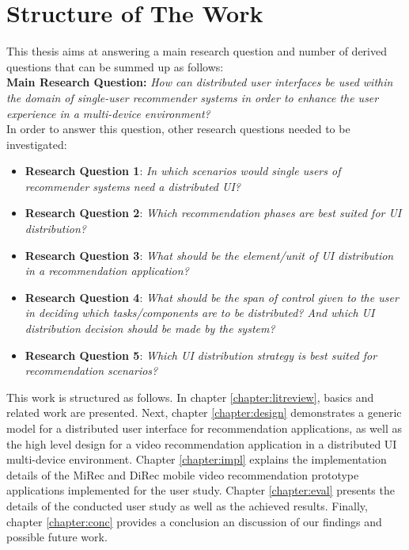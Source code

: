 \section{Structure of The Work}
This thesis aims at answering a main research question and number of derived
questions that can be summed up as follows:\\
\textbf{Main Research Question:} \textit{How can distributed user interfaces be
used within the domain of single-user recommender systems in order to enhance
the user experience in a multi-device environment? }\\
In order to answer this question, other research questions needed to be
investigated:
\begin{itemize}
\item \textbf{Research Question 1}: \textit{In which scenarios would single
users of recommender systems need a distributed UI?}
\item \textbf{Research Question 2}: \textit{Which recommendation phases are best
suited for UI distribution?}
\item \textbf{Research Question 3}: \textit{What should be the element/unit of
UI distribution in a recommendation application?}
\item \textbf{Research Question 4}: \textit{What should be the span of control
given to the user in deciding which tasks/components are to be distributed?
And which UI distribution decision should be made by the system?}
\item \textbf{Research Question 5}: \textit{Which UI distribution strategy is
best suited for recommendation scenarios?}
\end{itemize}

This work is structured as follows. In chapter \ref{chapter:litreview}, basics
and related work are presented. Next, chapter \ref{chapter:design} demonstrates
a generic model for a distributed user interface for recommendation
applications, as well as the high level design for a video recommendation
application in a distributed UI multi-device environment.
Chapter \ref{chapter:impl} explains the implementation details of the MiRec and
DiRec mobile video recommendation prototype applications implemented for the
user study. Chapter \ref{chapter:eval} presents the details of the conducted
user study as well as the achieved results. Finally, chapter \ref{chapter:conc}
provides a conclusion an discussion of our findings and possible future work. 

